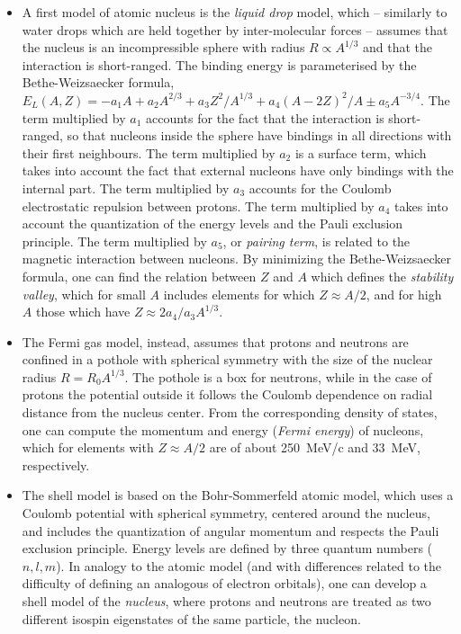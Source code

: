 \begin{itemize}
    \item A first model of atomic nucleus is the \emph{liquid drop} model, which -- similarly to water drops which are held together by inter-molecular forces -- assumes that the nucleus is an incompressible sphere with radius $R\propto A^{1/3}$ and that the interaction is short-ranged. The binding energy is parameterised by the Bethe-Weizsaecker formula, $E_L(A,Z) = -a_1 A + a_2 A^{2/3} + a_3 Z^2/A^{1/3} + a_4 (A-2Z)^2/A \pm a_5 A^{-3/4}$. The term multiplied by $a_1$ accounts for the fact that the interaction is short-ranged, so that nucleons inside the sphere have bindings in all directions with their first neighbours. The term multiplied by $a_2$ is a surface term, which takes into account the fact that external nucleons have only bindings with the internal part. The term multiplied by $a_3$ accounts for the Coulomb electrostatic repulsion between protons. The term multiplied by $a_4$ takes into account the quantization of the energy levels and the Pauli exclusion principle. The term multiplied by $a_5$, or \emph{pairing term}, is related to the magnetic interaction between nucleons. By minimizing the Bethe-Weizsaecker formula, one can find the relation between $Z$ and $A$ which defines the \emph{stability valley}, which for small $A$ includes elements for which $Z\approx A/2$, and for high $A$ those which have $Z\approx 2a_4/a_3 A^{1/3}$.
    \item The Fermi gas model, instead, assumes that protons and neutrons are confined in a pothole with spherical symmetry with the size of the nuclear radius $R=R_0 A^{1/3}$. The pothole is a box for neutrons, while in the case of protons the potential outside it follows the Coulomb dependence on radial distance from the nucleus center. From the corresponding density of states, one can compute the momentum and energy (\emph{Fermi energy}) of nucleons, which for elements with $Z\approx A/2$ are of about \SI{250}{MeV/c} and \SI{33}{MeV}, respectively.
    \item The shell model is based on the Bohr-Sommerfeld atomic model, which uses a Coulomb potential with spherical symmetry, centered around the nucleus, and includes the quantization of angular momentum and respects the Pauli exclusion principle. Energy levels are defined by three quantum numbers ($n, l, m$). In analogy to the atomic model (and with differences related to the difficulty of defining an analogous of electron orbitals), one can develop a shell model of the \emph{nucleus}, where protons and neutrons are treated as two different isospin eigenstates of the same particle, the nucleon.

\end{itemize}
